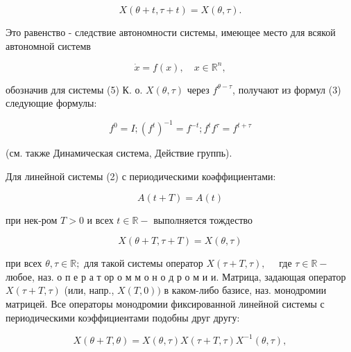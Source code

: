 \documentclass[10pt]{article}
\begin{document}
\[

X(\theta+t, \tau+t)=X(\theta, \tau) .

\]



Это равенство - следствие автономности системы, имеющее место для всякой автономной системв



\[

\dot{x}=f(x), \quad x \in \mathbb{R}^{n},

\]



обозначив для системы (5) К. о. $X(\theta, \tau)$ через $f^{\theta-\tau}$, получают из формул (3) следующие формулы:



\[

f^{0}=I ;\left(f^{t}\right)^{-1}=f^{-t} ; f^{t} f^{\tau}=f^{t+\tau}

\]



(см. также Динамическая система, Действие группь).



Для линейной системы (2) с периодическими коәффициентами:



\[

A(t+T)=A(t)

\]



при нек-ром $T>0$ и всех $t \in \mathbb{R}-$ выполняется тождество



\[

X(\theta+T, \tau+T)=X(\theta, \tau)

\]



при всех $\theta, \tau \in \mathbb{R} ;$ для такой системы оператор $X(\tau+T, \tau), \quad$ где $\tau \in \mathbb{R}-$ любое, наз. о п е р а т ор о м м о н о д р о м и и. Матрица, задающая оператор $X(\tau+T, \tau)$ (или, напр., $X(T, 0))$ в каком-либо базисе, наз. монодромии матрицей. Все операторы монодромии фиксированной линейной системы с периодическими коэффициентами подобны друг другу:



\[

X(\theta+T, \theta)=X(\theta, \tau) X(\tau+T, \tau) X^{-1}(\theta, \tau),

\]
\end{document}
